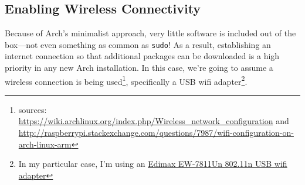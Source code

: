 \documentclass[12pt,letterpaper]{article}
\newcommand\styledhref[2]{\href{#1}{\sf #2}}
\begin{document}
\subsection{Enabling Wireless Connectivity}
Because of Arch's minimalist approach, very little software is included out of the box---not even something as common as \lstinline{sudo}!  As a result, establishing an internet connection so that additional packages can be downloaded is a high priority in any new Arch installation.  In this case, we're going to assume a wireless connection is being used\footnote{sources: \url{https://wiki.archlinux.org/index.php/Wireless_network_configuration} and \url{http://raspberrypi.stackexchange.com/questions/7987/wifi-configuration-on-arch-linux-arm}}, specifically a USB wifi adapter\footnote{In my particular case, I'm using an \styledhref{http://lmgtfy.com/?q=\%22Edimax+EW-7811Un\%22}{Edimax EW-7811Un 802.11n USB wifi adapter}}.
\end{document}
